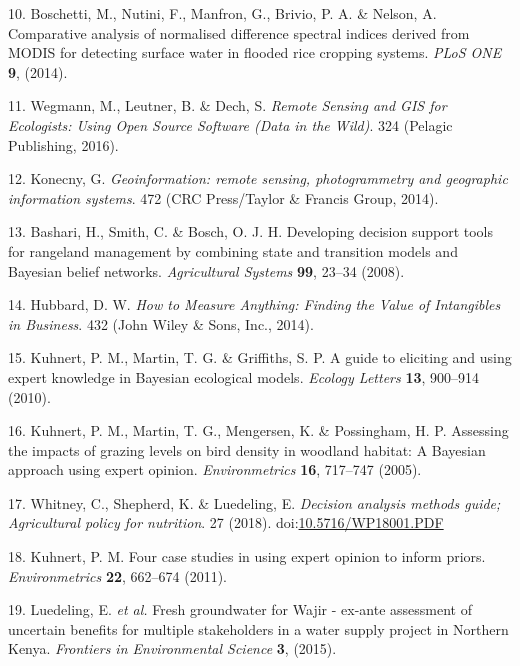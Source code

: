 \documentclass[12pt,oneside]{article}
\begin{document}
\leavevmode\hypertarget{ref-Boschetti_et_al_2014}{}%
10. Boschetti, M., Nutini, F., Manfron, G., Brivio, P. A. \& Nelson, A.
Comparative analysis of normalised difference spectral indices derived
from MODIS for detecting surface water in flooded rice cropping systems.
\emph{PLoS ONE} \textbf{9}, (2014).

\leavevmode\hypertarget{ref-Wegmann_et_al_2016}{}%
11. Wegmann, M., Leutner, B. \& Dech, S. \emph{Remote Sensing and GIS
for Ecologists: Using Open Source Software (Data in the Wild)}. 324
(Pelagic Publishing, 2016).

\leavevmode\hypertarget{ref-Konecny_2014}{}%
12. Konecny, G. \emph{Geoinformation: remote sensing, photogrammetry and
geographic information systems}. 472 (CRC Press/Taylor \& Francis Group,
2014).

\leavevmode\hypertarget{ref-Bashari_et_al_2008}{}%
13. Bashari, H., Smith, C. \& Bosch, O. J. H. Developing decision
support tools for rangeland management by combining state and transition
models and Bayesian belief networks. \emph{Agricultural Systems}
\textbf{99}, 23--34 (2008).

\leavevmode\hypertarget{ref-Hubbard_2014}{}%
14. Hubbard, D. W. \emph{How to Measure Anything: Finding the Value of
Intangibles in Business}. 432 (John Wiley \& Sons, Inc., 2014).

\leavevmode\hypertarget{ref-Kuhnert_et_al_2010}{}%
15. Kuhnert, P. M., Martin, T. G. \& Griffiths, S. P. A guide to
eliciting and using expert knowledge in Bayesian ecological models.
\emph{Ecology Letters} \textbf{13}, 900--914 (2010).

\leavevmode\hypertarget{ref-Kuhnert_et_al_2005}{}%
16. Kuhnert, P. M., Martin, T. G., Mengersen, K. \& Possingham, H. P.
Assessing the impacts of grazing levels on bird density in woodland
habitat: A Bayesian approach using expert opinion. \emph{Environmetrics}
\textbf{16}, 717--747 (2005).

\leavevmode\hypertarget{ref-Whitney_et_al_2018}{}%
17. Whitney, C., Shepherd, K. \& Luedeling, E. \emph{Decision analysis
methods guide; Agricultural policy for nutrition}. 27 (2018).
doi:\href{https://doi.org/10.5716/WP18001.PDF}{10.5716/WP18001.PDF}

\leavevmode\hypertarget{ref-Kuhnert_2011}{}%
18. Kuhnert, P. M. Four case studies in using expert opinion to inform
priors. \emph{Environmetrics} \textbf{22}, 662--674 (2011).

\leavevmode\hypertarget{ref-Luedeling_et_al_2015}{}%
19. Luedeling, E. \emph{et al.} Fresh groundwater for Wajir - ex-ante
assessment of uncertain benefits for multiple stakeholders in a water
supply project in Northern Kenya. \emph{Frontiers in Environmental
Science} \textbf{3}, (2015).
\end{document}
